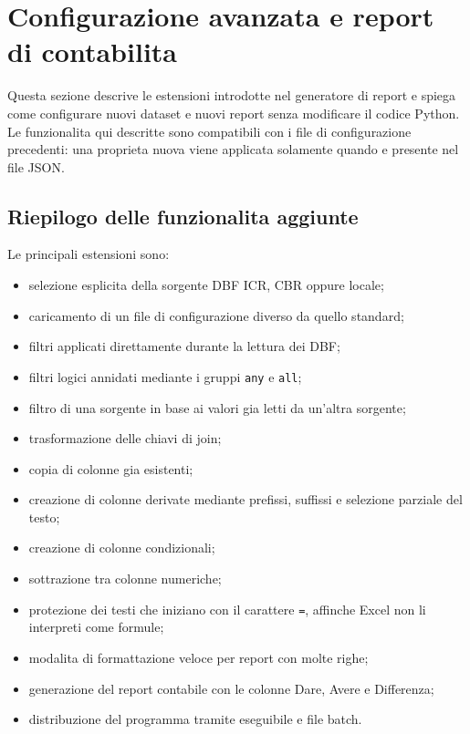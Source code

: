 
\section{Configurazione avanzata e report di contabilita}
\label{sec:configurazione-avanzata}

Questa sezione descrive le estensioni introdotte nel generatore di report e
spiega come configurare nuovi dataset e nuovi report senza modificare il
codice Python. Le funzionalita qui descritte sono compatibili con i file di
configurazione precedenti: una proprieta nuova viene applicata solamente
quando e presente nel file JSON.

\subsection{Riepilogo delle funzionalita aggiunte}

Le principali estensioni sono:

\begin{itemize}
  \item selezione esplicita della sorgente DBF ICR, CBR oppure locale;
  \item caricamento di un file di configurazione diverso da quello standard;
  \item filtri applicati direttamente durante la lettura dei DBF;
  \item filtri logici annidati mediante i gruppi \texttt{any} e \texttt{all};
  \item filtro di una sorgente in base ai valori gia letti da un'altra sorgente;
  \item trasformazione delle chiavi di join;
  \item copia di colonne gia esistenti;
  \item creazione di colonne derivate mediante prefissi, suffissi e
        selezione parziale del testo;
  \item creazione di colonne condizionali;
  \item sottrazione tra colonne numeriche;
  \item protezione dei testi che iniziano con il carattere \texttt{=},
        affinche Excel non li interpreti come formule;
  \item modalita di formattazione veloce per report con molte righe;
  \item generazione del report contabile con le colonne Dare, Avere e
        Differenza;
  \item distribuzione del programma tramite eseguibile e file batch.
\end{itemize}

